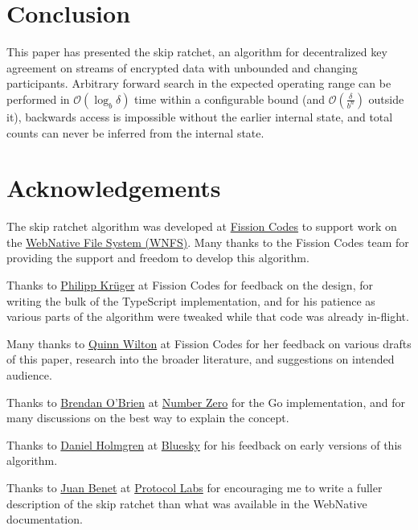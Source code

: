 \documentclass[twocolumn]{article}
\begin{document}
	\section{Conclusion}
	
	This paper has presented the skip ratchet, an algorithm for decentralized key agreement on streams of encrypted data with unbounded and changing participants. Arbitrary forward search in the expected operating range can be performed in $\mathcal{O}(\log_{b} \delta)$ time within a configurable bound (and $\mathcal{O}(\frac{\delta}{b^{n}})$ outside it), backwards access is impossible without the earlier internal state, and total counts can never be inferred from the internal state.
    
    \section{Acknowledgements}
    
    The skip ratchet algorithm was developed at \href{https://fission.codes}{Fission Codes} to support work on the \href{https://github.com/fission-suite/webnative}{WebNative File System (WNFS)}. Many thanks to the Fission Codes team for providing the support and freedom to develop this algorithm.
    
    Thanks to \href{https://github.com/matheus23/}{Philipp Krüger} at Fission Codes for  feedback on the design, for writing the bulk of the TypeScript implementation\cite{ts-wnfs-ratchet}, and for his patience as various parts of the algorithm were tweaked while that code was already in-flight.
    
    Many thanks to \href{https://github.com/QuinnWilton}{Quinn Wilton} at Fission Codes for her feedback on various drafts of this paper, research into the broader literature, and suggestions on intended audience.
    
    Thanks to \href{https://github.com/b5/}{Brendan O'Brien} at \href{https://n0.computer/}{Number Zero} for the {Go implementation}\cite{go-wnfs-ratchet}, and for many discussions on the best way to explain the concept.
    
    Thanks to \href{https://github.com/dholms}{Daniel Holmgren} at \href{https://blueskyweb.xyz}{Bluesky} for his feedback on early versions of this algorithm.
    
    Thanks to \href{https://github.com/jbenet/}{Juan Benet} at \href{https://protocol.ai/}{Protocol Labs} for encouraging me to write a fuller description of the skip ratchet than what was available in the WebNative documentation.

    \printbibliography[title={References}]
\end{document}
